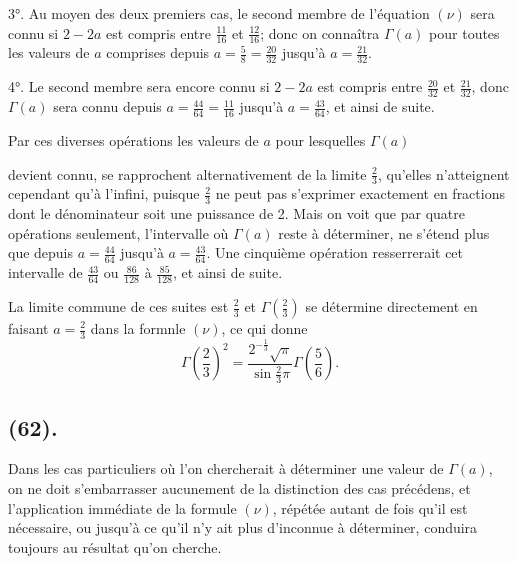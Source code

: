 \documentclass{article}
\begin{document}
3°. Au moyen des deux premiers cas, le second membre de l'équation $(\nu)$ sera connu si $2-2a$ est compris entre $\frac{11}{16}$ et $\frac{12}{16}$; donc on connaîtra $\Gamma(a)$ pour toutes les valeurs de $a$ comprises depuis $a=\frac{5}{8}=\frac{20}{32}$ jusqu'à $a=\frac{21}{32}$.

4°. Le second membre sera encore connu si $2-2a$ est compris entre $\frac{20}{32}$ et $\frac{21}{32}$, donc $\Gamma(a)$ sera connu depuis $a=\frac{44}{64}=\frac{11}{16}$ jusqu'à $a=\frac{43}{64}$, et ainsi de suite.

Par ces diverses opérations les valeurs de $a$ pour lesquelles $\Gamma(a)$

devient connu, se rapprochent alternativement de la limite $\frac{2}{3}$, qu'elles n'atteignent cependant qu'à l'infini, puisque $\frac{2}{3}$ ne peut pas s'exprimer exactement en fractions dont le dénominateur soit une puissance de 2. Mais on voit que par quatre opérations seulement, l'intervalle où $\Gamma(a)$ reste à déterminer, ne s'étend plus que depuis $a=\frac{44}{64}$ jusqu'à $a=\frac{43}{64}$. Une cinquième opération resserrerait cet intervalle de $\frac{43}{64}$ ou $\frac{86}{128}$ à $\frac{85}{128}$, et ainsi de suite.

La limite commune de ces suites est $\frac{2}{3}$ et $\Gamma\left(\frac{2}{3}\right)$ se détermine directement en faisant $a=\frac{2}{3}$ dans la formnle $(\nu)$, ce qui donne
\[ \Gamma\left(\frac{2}{3}\right)^{2}=\frac{2^{-\frac{1}{3}}\sqrt{\pi}}{\sin\frac{2}{3}\pi}\Gamma\left(\frac{5}{6}\right). \]

\subsection*{(62).}

Dans les cas particuliers où l'on chercherait à déterminer une valeur de $\Gamma(a)$, on ne doit s'embarrasser aucunement de la distinction des cas précédens, et l'application immédiate de la formule $(\nu)$, répétée autant de fois qu'il est nécessaire, ou jusqu'à ce qu'il n'y ait plus d'inconnue à déterminer, conduira toujours au résultat qu'on cherche.
\end{document}

